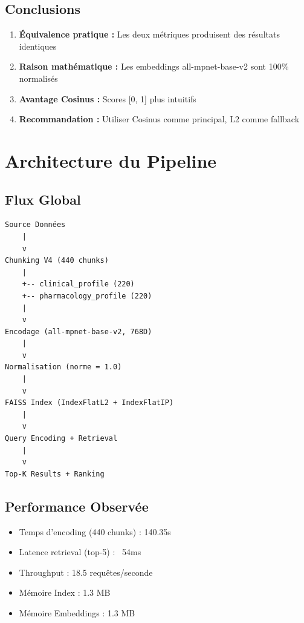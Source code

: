 \documentclass[12pt,a4paper]{article}
\begin{document}
\subsection{Conclusions}

\begin{enumerate}
    \item \textbf{Équivalence pratique :} Les deux métriques produisent des résultats identiques
    \item \textbf{Raison mathématique :} Les embeddings all-mpnet-base-v2 sont 100\% normalisés
    \item \textbf{Avantage Cosinus :} Scores [0, 1] plus intuitifs
    \item \textbf{Recommandation :} Utiliser Cosinus comme principal, L2 comme fallback
\end{enumerate}

\section{Architecture du Pipeline}

\subsection{Flux Global}

\begin{verbatim}
Source Données
    |
    v
Chunking V4 (440 chunks)
    |
    +-- clinical_profile (220)
    +-- pharmacology_profile (220)
    |
    v
Encodage (all-mpnet-base-v2, 768D)
    |
    v
Normalisation (norme = 1.0)
    |
    v
FAISS Index (IndexFlatL2 + IndexFlatIP)
    |
    v
Query Encoding + Retrieval
    |
    v
Top-K Results + Ranking
\end{verbatim}

\subsection{Performance Observée}

\begin{itemize}
    \item Temps d'encoding (440 chunks) : 140.35s
    \item Latence retrieval (top-5) : ~54ms
    \item Throughput : 18.5 requêtes/seconde
    \item Mémoire Index : 1.3 MB
    \item Mémoire Embeddings : 1.3 MB
\end{itemize}
\end{document}
